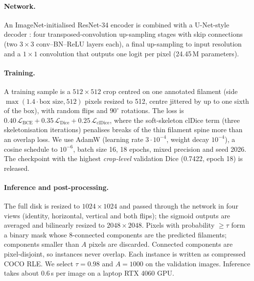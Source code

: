 \documentclass[sigconf]{acmart}
\begin{document}
\paragraph{Network.} An ImageNet-initialised ResNet-34 encoder \cite{he2016resnet} is combined with a U-Net-style decoder \cite{ronneberger2015unet}: four transposed-convolution up-sampling stages with skip connections (two $3\times3$ conv--BN--ReLU layers each), a final up-sampling to input resolution and a $1\times1$ convolution that outputs one logit per pixel (24.45\,M parameters).

\paragraph{Training.} A training sample is a $512\times512$ crop centred on one annotated filament (side $\max(1.4\cdot\text{box size},512)$ pixels resized to 512, centre jittered by up to one sixth of the box), with random flips and $90^\circ$ rotations. The loss is $0.40\,\mathcal{L}_{\mathrm{BCE}}+0.35\,\mathcal{L}_{\mathrm{Dice}}+0.25\,\mathcal{L}_{\mathrm{clDice}}$, where the soft-skeleton clDice term \cite{shit2021cldice} (three skeletonisation iterations) penalises breaks of the thin filament spine more than an overlap loss. We use AdamW \cite{loshchilov2019adamw} (learning rate $3\cdot10^{-4}$, weight decay $10^{-4}$), a cosine schedule to $10^{-6}$, batch size 16, 18 epochs, mixed precision and seed 2026. The checkpoint with the highest \emph{crop-level} validation Dice (0.7422, epoch 18) is released.

\paragraph{Inference and post-processing.} The full disk is resized to $1024\times1024$ and passed through the network in four views (identity, horizontal, vertical and both flips); the sigmoid outputs are averaged and bilinearly resized to $2048\times2048$. Pixels with probability $\ge\tau$ form a binary mask whose 8-connected components are the predicted filaments; components smaller than $A$ pixels are discarded. Connected components are pixel-disjoint, so instances never overlap. Each instance is written as compressed COCO RLE. We select $\tau=0.98$ and $A=1000$ on the validation images. Inference takes about 0.6\,s per image on a laptop RTX 4060 GPU.


\end{document}
